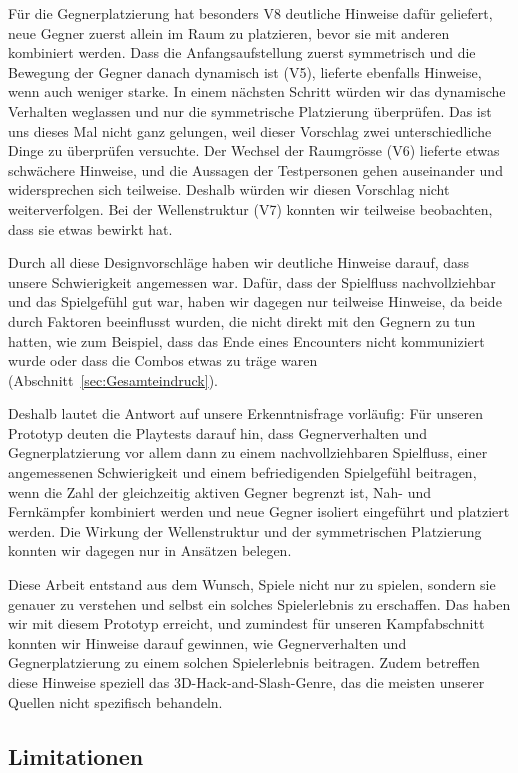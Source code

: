 \documentclass[../Main.tex]{subfiles}
\begin{document}
Für die Gegnerplatzierung hat besonders V8 deutliche Hinweise dafür geliefert, neue Gegner zuerst allein im Raum zu platzieren, bevor sie mit anderen kombiniert werden. Dass die Anfangsaufstellung zuerst symmetrisch und die Bewegung der Gegner danach dynamisch ist (V5), lieferte ebenfalls Hinweise, wenn auch weniger starke. In einem nächsten Schritt würden wir das dynamische Verhalten weglassen und nur die symmetrische Platzierung überprüfen. Das ist uns dieses Mal nicht ganz gelungen, weil dieser Vorschlag zwei unterschiedliche Dinge zu überprüfen versuchte. Der Wechsel der Raumgrösse (V6) lieferte etwas schwächere Hinweise, und die Aussagen der Testpersonen gehen auseinander und widersprechen sich teilweise. Deshalb würden wir diesen Vorschlag nicht weiterverfolgen. Bei der Wellenstruktur (V7) konnten wir teilweise beobachten, dass sie etwas bewirkt hat.

Durch all diese Designvorschläge haben wir deutliche Hinweise darauf, dass unsere Schwierigkeit angemessen war. Dafür, dass der Spielfluss nachvollziehbar und das Spielgefühl gut war, haben wir dagegen nur teilweise Hinweise, da beide durch Faktoren beeinflusst wurden, die nicht direkt mit den Gegnern zu tun hatten, wie zum Beispiel, dass das Ende eines Encounters nicht kommuniziert wurde oder dass die Combos etwas zu träge waren (Abschnitt~\ref{sec:Gesamteindruck}).

Deshalb lautet die Antwort auf unsere Erkenntnisfrage vorläufig: Für unseren Prototyp deuten die Playtests darauf hin, dass Gegnerverhalten und Gegnerplatzierung vor allem dann zu einem nachvollziehbaren Spielfluss, einer angemessenen Schwierigkeit und einem befriedigenden Spielgefühl beitragen, wenn die Zahl der gleichzeitig aktiven Gegner begrenzt ist, Nah- und Fernkämpfer kombiniert werden und neue Gegner isoliert eingeführt und platziert werden. Die Wirkung der Wellenstruktur und der symmetrischen Platzierung konnten wir dagegen nur in Ansätzen belegen.

Diese Arbeit entstand aus dem Wunsch, Spiele nicht nur zu spielen, sondern sie genauer zu verstehen und selbst ein solches Spielerlebnis zu erschaffen. Das haben wir mit diesem Prototyp erreicht, und zumindest für unseren Kampfabschnitt konnten wir Hinweise darauf gewinnen, wie Gegnerverhalten und Gegnerplatzierung zu einem solchen Spielerlebnis beitragen. Zudem betreffen diese Hinweise speziell das 3D-Hack-and-Slash-Genre, das die meisten unserer Quellen nicht spezifisch behandeln.

\subsection{Limitationen} \label{sec:Limitationen}
\end{document}
